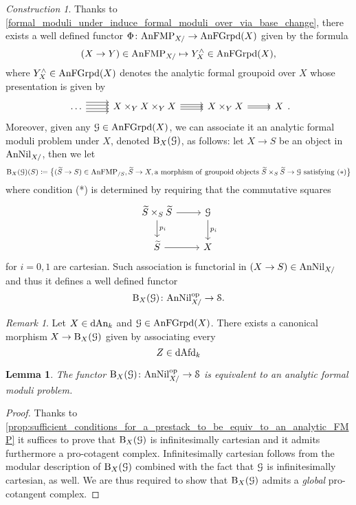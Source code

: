 \documentclass[10pt,a4paper,reqno]{amsart} %
\theoremstyle{plain}
\newtheorem{lem}[thm]{Lemma}
\theoremstyle{definition}
\theoremstyle{remark}
\newtheorem{rem}[thm]{Remark}
\numberwithin{equation}{section}
\newtheorem{construction}[thm]{Construction}
\begin{document}
\begin{construction} Thanks to \cref{formal_moduli_under_induce_formal_moduli_over_via_base_change},
there exists a well defined functor $\Phi \colon \mathrm{AnFMP}_{X/} \to \mathrm{AnFGrpd}(X)$ given by the formula
    \[
        (X \to Y ) \in \mathrm{AnFMP}_{X/ } \mapsto Y^\wedge_X \in \mathrm{AnFGrpd}(X),
    \]
where $Y^\wedge_X \in \mathrm{AnFGrpd}(X)$ denotes the analytic formal groupoid over $X$ whose presentation is given by
    \[
    \begin{tikzcd}
      \dots \ar[r, shift left=2] \ar[r, shift left=0.75] 
      \ar[r, shift left=-0.75] \ar[r, shift left=-2]
      & X \times_Y X \times_Y X \ar[r, shift left=-1] \ar[r, shift left=1] \ar[r] 
      & X \times_Y X \ar[r, shift left=-0.25ex] \ar[r, shift left=0.25ex] 
      & X 
    \end{tikzcd}.
    \] 
Moreover, given any $\mathcal G \in \mathrm{AnFGrpd}(X)$, we can associate it an analytic formal moduli problem under $X$,
denoted $\mathrm B_{X}(\mathcal G)$, as follows: let $X \to S$ be an object
in $\mathrm{AnNil}_{X/}$, then we let
    \[
        \mathrm B_{X}(\mathcal G) (S) \coloneqq  \big\{ (\widetilde S \to S) \in \mathrm{AnFMP}_{/S}, \widetilde S \to X, \mathrm{a \ morphism \ of \ groupoid \ objects \ }\widetilde S \times_S \widetilde S \to \mathcal G \mathrm{ \ satisfying \  (*) 
        } \big\}
    \]
where condition (*) is determined by requiring that the commutative squares
    \[
    \begin{tikzcd}
        \tS \times_S \tS \ar{r} \ar{d}{p_i} & \cG \ar{d}{p_i} \\
        \tS \ar{r}   & X
    \end{tikzcd}
    \]
for $i=0, 1$ are cartesian. Such association is functorial in $(X \to S) \in \mathrm{AnNil}_{X/}$ and thus it defines a well defined functor
    \[
        \mathrm B_{X}(\mathcal G) \colon \mathrm{AnNil}_{X/ }^\mathrm{op} \to \mathcal S.  
    \]
\end{construction}

\begin{rem}
    Let $X \in \mathrm{dAn}_k$ and $\mathcal G \in \mathrm{AnFGrpd}(X)$. There exists a canonical morphism $X \to \mathrm B_X(\mathcal G)$ given by associating every 
        \[
            Z \in \mathrm{dAfd}_k
        \]
\end{rem}

\begin{lem}
    The functor $\mathrm B_X(\mathcal G) \colon \mathrm{AnNil}_{X/}^\mathrm{op} \to \mathcal S$ is equivalent to an analytic formal moduli problem.
\end{lem}

\begin{proof}
    Thanks to \cref{prop:sufficient_conditions_for_a_prestack_to_be_equiv_to_an_analytic_FMP} it suffices to prove that $\mathrm B_X(\mathcal G)$ is
    infinitesimally cartesian and it admits furthermore a pro-cotagent complex. Infinitesimally cartesian follows from the modular description
    of $\mathrm B_X(\mathcal G)$ combined with the fact that $\mathcal G$ is infinitesimally cartesian, as well. We are thus required to show that $\mathrm B_X(\mathcal G)$ admits
    a \emph{global} pro-cotangent complex. 
\end{proof}




\end{document}
